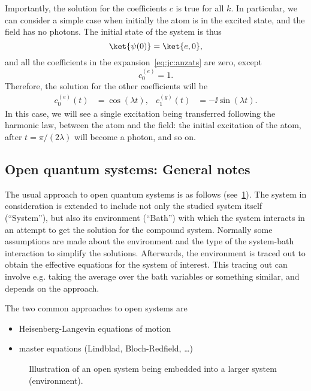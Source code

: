 \documentclass[fontsize=9pt,bookmarkpackage=false]{scrartcl}
\newcommand{\inputtikz}[1]{%
  \tikzsetnextfilename{#1}%
}
\begin{document}
Importantly, the solution for the coefficients $c$ is true for all $k$.
In particular, we can consider a simple case when initially the atom is in the excited state, and the field has no photons.
The initial state of the system is thus
\begin{equation}
  \ket{ \psi (0) } = \ket{ e, 0 },
\end{equation}
and all the coefficients in the expansion~\eqref{eq:jc:anzats} are zero, except
\begin{equation}
  c_0^{(e)} = 1.
\end{equation}
Therefore, the solution for the other coefficients will be
\begin{align}
  c_0^{(e)} (t) & = \cos(  \lambda t ),
  &
  c_1^{(g)} (t) & = - \ii \sin ( \lambda t ).
\end{align}
In this case, we will see a single excitation being transferred following the harmonic law, between the atom and the field: the initial excitation of the atom, after $t = \pi / ( 2 \lambda)$ will become a photon, and so on.

\subsection{Open quantum systems: General notes} %
\label{sec:open_quantum_systems}

The usual approach to open quantum systems is as follows (see~\cref{fig:opensys}).
The system in consideration is extended to include not only the studied system itself (``System''), but also its environment (``Bath'') with which the system interacts in an attempt to get the solution for the compound system.
Normally some assumptions are made about the environment and the type of the system-bath interaction to simplify the solutions.
Afterwards, the environment is traced out to obtain the effective equations for the system of interest.
This tracing out can involve e.g. taking the average over the bath variables or something similar, and depends on the approach.

The two common approaches to open systems are
\begin{itemize}
  \tightlist
  \item Heisenberg-Langevin equations of motion
  \item master equations (Lindblad, Bloch-Redfield, \dots)
\end{itemize}

\begin{figure}[htb]
  \centering
  \inputtikz{open_systems}
  \caption{Illustration of an open system being embedded into a larger system (environment).}
  \label{fig:opensys}
\end{figure}
\end{document}
